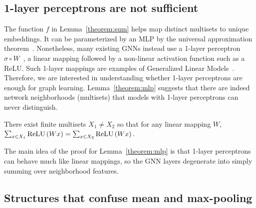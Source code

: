 \subsection{1-layer perceptrons are not sufficient}
The function $f$ in Lemma~\ref{theorem:sum} helps map distinct multisets to unique embeddings. It can be parameterized by an MLP by the universal approximation theorem~\citep{hornik1991approximation}. Nonetheless, many existing GNNs instead use a 1-layer perceptron $\sigma \circ W$~\citep{duvenaud2015convolutional, kipf2016semi, zhang2018end}, a linear mapping followed by a non-linear activation function such as a ReLU. Such 1-layer mappings are examples of Generalized Linear Models~\citep{Neld:Wedd:1972}. Therefore, we are interested in understanding whether 1-layer perceptrons are enough for graph learning. %
Lemma~\ref{theorem:mlp} suggests that there are indeed network neighborhoods (multisets) that models with 1-layer perceptrons can never distinguish.
%
\begin{lemma}
\label{theorem:mlp}
There exist finite multisets $X_1 \neq X_2$ so that for any linear mapping $W$,  $ \sum\nolimits_{x \in X_1} {\rm ReLU} \left( Wx \right) = \sum\nolimits_{x \in X_2} {\rm ReLU} \left( Wx \right). $ %
\end{lemma}
%
The main idea of the proof for Lemma~\ref{theorem:mlp} is that 1-layer perceptrons can behave much like linear mappings, so the GNN layers degenerate into simply summing over neighborhood features. 



\subsection{Structures that confuse mean and max-pooling }
\label{sec:confuse}

